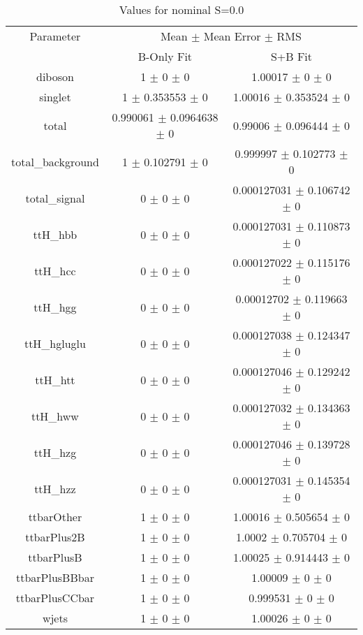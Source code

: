 \begin{table}
\centering
\caption{Values for nominal S=0.0}
\begin{tabular}{ccc}
\toprule
Parameter & \multicolumn{2}{c}{Mean $\pm$ Mean Error $\pm$ RMS}\\
 & B-Only Fit & S+B Fit\\
\midrule
diboson & \num{1} $\pm$ \num{0} $\pm$ \num{0} & \num{1.00017} $\pm$ \num{0} $\pm$ \num{0}\\
singlet & \num{1} $\pm$ \num{0.353553} $\pm$ \num{0} & \num{1.00016} $\pm$ \num{0.353524} $\pm$ \num{0}\\
total & \num{0.990061} $\pm$ \num{0.0964638} $\pm$ \num{0} & \num{0.99006} $\pm$ \num{0.096444} $\pm$ \num{0}\\
total\_background & \num{1} $\pm$ \num{0.102791} $\pm$ \num{0} & \num{0.999997} $\pm$ \num{0.102773} $\pm$ \num{0}\\
total\_signal & \num{0} $\pm$ \num{0} $\pm$ \num{0} & \num{0.000127031} $\pm$ \num{0.106742} $\pm$ \num{0}\\
ttH\_hbb & \num{0} $\pm$ \num{0} $\pm$ \num{0} & \num{0.000127031} $\pm$ \num{0.110873} $\pm$ \num{0}\\
ttH\_hcc & \num{0} $\pm$ \num{0} $\pm$ \num{0} & \num{0.000127022} $\pm$ \num{0.115176} $\pm$ \num{0}\\
ttH\_hgg & \num{0} $\pm$ \num{0} $\pm$ \num{0} & \num{0.00012702} $\pm$ \num{0.119663} $\pm$ \num{0}\\
ttH\_hgluglu & \num{0} $\pm$ \num{0} $\pm$ \num{0} & \num{0.000127038} $\pm$ \num{0.124347} $\pm$ \num{0}\\
ttH\_htt & \num{0} $\pm$ \num{0} $\pm$ \num{0} & \num{0.000127046} $\pm$ \num{0.129242} $\pm$ \num{0}\\
ttH\_hww & \num{0} $\pm$ \num{0} $\pm$ \num{0} & \num{0.000127032} $\pm$ \num{0.134363} $\pm$ \num{0}\\
ttH\_hzg & \num{0} $\pm$ \num{0} $\pm$ \num{0} & \num{0.000127046} $\pm$ \num{0.139728} $\pm$ \num{0}\\
ttH\_hzz & \num{0} $\pm$ \num{0} $\pm$ \num{0} & \num{0.000127031} $\pm$ \num{0.145354} $\pm$ \num{0}\\
ttbarOther & \num{1} $\pm$ \num{0} $\pm$ \num{0} & \num{1.00016} $\pm$ \num{0.505654} $\pm$ \num{0}\\
ttbarPlus2B & \num{1} $\pm$ \num{0} $\pm$ \num{0} & \num{1.0002} $\pm$ \num{0.705704} $\pm$ \num{0}\\
ttbarPlusB & \num{1} $\pm$ \num{0} $\pm$ \num{0} & \num{1.00025} $\pm$ \num{0.914443} $\pm$ \num{0}\\
ttbarPlusBBbar & \num{1} $\pm$ \num{0} $\pm$ \num{0} & \num{1.00009} $\pm$ \num{0} $\pm$ \num{0}\\
ttbarPlusCCbar & \num{1} $\pm$ \num{0} $\pm$ \num{0} & \num{0.999531} $\pm$ \num{0} $\pm$ \num{0}\\
wjets & \num{1} $\pm$ \num{0} $\pm$ \num{0} & \num{1.00026} $\pm$ \num{0} $\pm$ \num{0}\\
\bottomrule
\end{tabular}
\end{table}